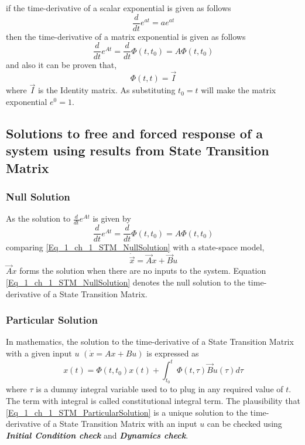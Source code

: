 if the time-derivative of a scalar exponential is given as follows
\begin{equation}
	\frac{d}{dt}e^{at} = a e^{at}
\end{equation}
then the time-derivative of a matrix exponential is given as follows
\begin{equation}
\frac{d}{dt}e^{At} = \frac{d}{dt}\Phi(t, t_{0}) = A \Phi(t, t_{0})
\end{equation}
and also it can be proven that,
\begin{equation}
	\Phi(t, t) = \vec{I}
\end{equation}
where $\vec{I}$ is the Identity matrix. As substituting $t_{0} = t$ will make the matrix exponential $e^{0} = 1$.

\subsection{Solutions to free and forced response of a system using results from State Transition Matrix}
\subsubsection{Null Solution}
As the solution to $\frac{d}{dt}e^{At}$ is given by
\begin{equation} \label{Eq_1_ch_1_STM_NullSolution}
	\frac{d}{dt}e^{At} = \frac{d}{dt}\Phi(t, t_{0}) = A \Phi(t, t_{0})
\end{equation}
comparing \eqref{Eq_1_ch_1_STM_NullSolution} with a state-space model,
$$\dot{\vec{x}} = \vec{A}x + \vec{B}u$$ $\vec{A}x$ forms the solution when there are no inputs to the system. Equation \eqref{Eq_1_ch_1_STM_NullSolution} denotes the null solution to the time-derivative of a State Transition Matrix.

\subsubsection{Particular Solution}
In mathematics, the solution to the time-derivative of a State Transition Matrix with a given input $u$ $(\dot{x} = Ax + Bu)$ is expressed as
\begin{equation} \label{Eq_1_ch_1_STM_ParticularSolution}
	x(t) = \Phi(t, t_{0}) x(t) + \int_{t_{0}}^{t} \Phi(t, \tau) \vec{B}u(\tau)d\tau
\end{equation}
where $\tau$ is a dummy integral variable used to to plug in any required value of $t$. The term with integral is called constitutional integral term. The plausibility that \eqref{Eq_1_ch_1_STM_ParticularSolution} is a unique solution to the time-derivative of a State Transition Matrix with an input $u$ can be checked using \textbf{\textit{Initial Condition check}} and \textbf{\textit{Dynamics check}}.

